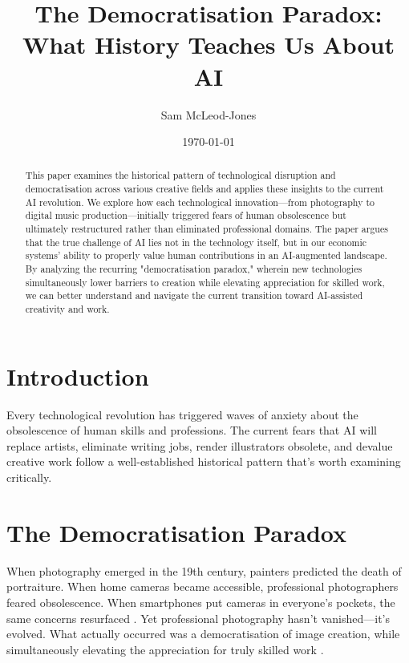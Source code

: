 \documentclass[12pt]{article}
\title{The Democratisation Paradox: What History Teaches Us About AI}
\author{Sam McLeod-Jones}
\date{\today}
\begin{document}
\maketitle

\begin{abstract}
This paper examines the historical pattern of technological disruption and democratisation across various creative fields and applies these insights to the current AI revolution. We explore how each technological innovation—from photography to digital music production—initially triggered fears of human obsolescence but ultimately restructured rather than eliminated professional domains. The paper argues that the true challenge of AI lies not in the technology itself, but in our economic systems' ability to properly value human contributions in an AI-augmented landscape. By analyzing the recurring "democratisation paradox," wherein new technologies simultaneously lower barriers to creation while elevating appreciation for skilled work, we can better understand and navigate the current transition toward AI-assisted creativity and work.
\end{abstract}

\section{Introduction}

Every technological revolution has triggered waves of anxiety about the obsolescence of human skills and professions. The current fears that AI will replace artists, eliminate writing jobs, render illustrators obsolete, and devalue creative work follow a well-established historical pattern that's worth examining critically.

\section{The Democratisation Paradox}

When photography emerged in the 19th century, painters predicted the death of portraiture. When home cameras became accessible, professional photographers feared obsolescence. When smartphones put cameras in everyone's pockets, the same concerns resurfaced \citep{benjamin1969work, batchen2001each}. Yet professional photography hasn't vanished—it's evolved. What actually occurred was a democratisation of image creation, while simultaneously elevating the appreciation for truly skilled work \citep{hand2012ubiquitous}.
\end{document}
